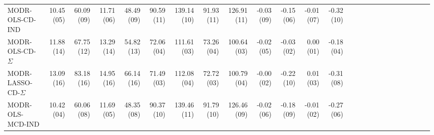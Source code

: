 \begin{tabular}{lrrrrrrrrrrrrrrrrrrrrrrrr}
MODR-OLS-CD-IND & {\cellcolor[HTML]{4291C2}} \color[HTML]{F1F1F1} 10.45 (05) & {\cellcolor[HTML]{FBCEB7}} \color[HTML]{000000} 60.09 (09) & {\cellcolor[HTML]{4695C4}} \color[HTML]{F1F1F1} 11.71 (06) & {\cellcolor[HTML]{F9C2A7}} \color[HTML]{000000} 48.49 (09) & {\cellcolor[HTML]{F8BDA1}} \color[HTML]{000000} 90.59 (11) & {\cellcolor[HTML]{F9EDE5}} \color[HTML]{000000} 139.14 (10) & {\cellcolor[HTML]{F8BDA1}} \color[HTML]{000000} 91.93 (11) & {\cellcolor[HTML]{F9EEE7}} \color[HTML]{000000} 126.91 (11) & {\cellcolor[HTML]{134C87}} \color[HTML]{F1F1F1} -0.03 (09) & {\cellcolor[HTML]{3885BC}} \color[HTML]{F1F1F1} -0.15 (06) & {\cellcolor[HTML]{0A3B70}} \color[HTML]{F1F1F1} -0.01 (07) & {\cellcolor[HTML]{87BEDA}} \color[HTML]{000000} -0.32 (10) \\
MODR-OLS-CD-$\Sigma$ & {\cellcolor[HTML]{F8BDA1}} \color[HTML]{000000} 11.88 (14) & {\cellcolor[HTML]{E27B62}} \color[HTML]{F1F1F1} 67.75 (12) & {\cellcolor[HTML]{FCD3BC}} \color[HTML]{000000} 13.29 (14) & {\cellcolor[HTML]{DA6853}} \color[HTML]{F1F1F1} 54.82 (13) & {\cellcolor[HTML]{134C87}} \color[HTML]{F1F1F1} 72.06 (04) & {\cellcolor[HTML]{0C3D73}} \color[HTML]{F1F1F1} 111.61 (03) & {\cellcolor[HTML]{134C87}} \color[HTML]{F1F1F1} 73.26 (04) & {\cellcolor[HTML]{0D3F76}} \color[HTML]{F1F1F1} 100.64 (03) & {\cellcolor[HTML]{0A3B70}} \color[HTML]{F1F1F1} -0.02 (05) & {\cellcolor[HTML]{09386D}} \color[HTML]{F1F1F1} -0.03 (02) & {\cellcolor[HTML]{053061}} \color[HTML]{F1F1F1} 0.00 (01) & {\cellcolor[HTML]{2065AB}} \color[HTML]{F1F1F1} -0.18 (04) \\
MODR-LASSO-CD-$\Sigma$ & {\cellcolor[HTML]{67001F}} \color[HTML]{F1F1F1} 13.09 (16) & {\cellcolor[HTML]{67001F}} \color[HTML]{F1F1F1} 83.18 (16) & {\cellcolor[HTML]{67001F}} \color[HTML]{F1F1F1} 14.95 (16) & {\cellcolor[HTML]{67001F}} \color[HTML]{F1F1F1} 66.14 (16) & {\cellcolor[HTML]{0E4179}} \color[HTML]{F1F1F1} 71.49 (03) & {\cellcolor[HTML]{0E4179}} \color[HTML]{F1F1F1} 112.08 (04) & {\cellcolor[HTML]{0E4179}} \color[HTML]{F1F1F1} 72.72 (03) & {\cellcolor[HTML]{0E4179}} \color[HTML]{F1F1F1} 100.79 (04) & {\cellcolor[HTML]{053061}} \color[HTML]{F1F1F1} -0.00 (02) & {\cellcolor[HTML]{71B0D3}} \color[HTML]{F1F1F1} -0.22 (10) & {\cellcolor[HTML]{08366A}} \color[HTML]{F1F1F1} 0.01 (03) & {\cellcolor[HTML]{7BB6D6}} \color[HTML]{000000} -0.31 (08) \\
MODR-OLS-MCD-IND & {\cellcolor[HTML]{3F8EC0}} \color[HTML]{F1F1F1} 10.42 (04) & {\cellcolor[HTML]{FBD0B9}} \color[HTML]{000000} 60.06 (08) & {\cellcolor[HTML]{4393C3}} \color[HTML]{F1F1F1} 11.69 (05) & {\cellcolor[HTML]{F9C4A9}} \color[HTML]{000000} 48.35 (08) & {\cellcolor[HTML]{F9C2A7}} \color[HTML]{000000} 90.37 (10) & {\cellcolor[HTML]{F9EBE3}} \color[HTML]{000000} 139.46 (11) & {\cellcolor[HTML]{F8BFA4}} \color[HTML]{000000} 91.79 (10) & {\cellcolor[HTML]{F9F0EB}} \color[HTML]{000000} 126.46 (09) & {\cellcolor[HTML]{0C3D73}} \color[HTML]{F1F1F1} -0.02 (06) & {\cellcolor[HTML]{4F9BC7}} \color[HTML]{F1F1F1} -0.18 (09) & {\cellcolor[HTML]{073467}} \color[HTML]{F1F1F1} -0.01 (02) & {\cellcolor[HTML]{529DC8}} \color[HTML]{F1F1F1} -0.27 (06) \\

\end{tabular}
